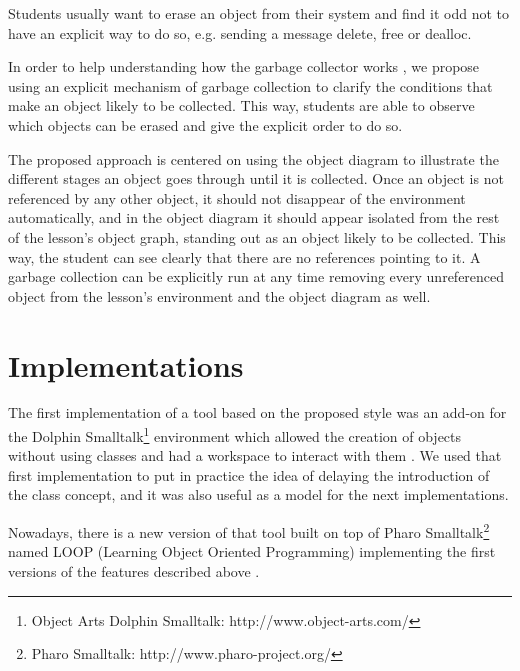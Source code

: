 \documentclass{sigplanconf}
\begin{document}
Students usually want to erase an object from their system and find it odd not to have an explicit way to do so, e.g. sending a message delete, free or dealloc.

In order to help understanding how the garbage collector works \cite{Hert05}, we propose using an explicit mechanism of garbage collection to clarify the conditions that make an object likely to be collected. This way, students are able to observe which objects can be erased and give the explicit order to do so.

The proposed approach is centered on using the object diagram to illustrate the different stages an object goes through until it is collected. Once an object is not referenced by any other object, it should not disappear of the environment automatically, and in the object diagram it should appear isolated from the rest of the lesson's object graph, standing out as an object likely to be collected. This way, the student can see clearly that there are no references pointing to it. A garbage collection can be explicitly run at any time removing every unreferenced object from the lesson's environment and the object diagram as well.

\section{Implementations}

The first implementation of a tool based on the proposed style was an add-on for the Dolphin Smalltalk\footnote{Object Arts Dolphin Smalltalk: http://www.object-arts.com/} environment which allowed the creation of objects without using classes and had a workspace to interact with them \cite{Lomb07}.  We used that first implementation to put in practice the idea of delaying the introduction of the class concept, and it was also useful as a model for the next implementations.

\bigskip
Nowadays, there is a new version of that tool built on top of Pharo Smalltalk\footnote{Pharo Smalltalk: http://www.pharo-project.org/} named LOOP  (Learning Object Oriented Programming) implementing the first versions of the features described above \cite{Lomb07}.
\end{document}
